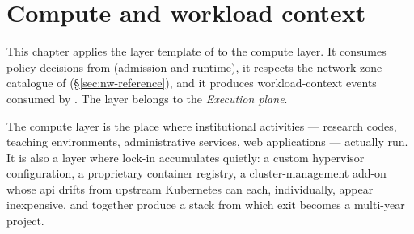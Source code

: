 
\chapter{Compute and workload context}
\label{ch:compute}

\begin{caveatbox}[Dependencies]
\noindent This chapter applies the layer template of
 to the compute layer. It consumes policy
decisions from  (admission and runtime), it
respects the network zone catalogue of 
(\S\ref{sec:nw-reference}), and it produces workload-context events
consumed by . The layer belongs to the
\emph{Execution plane}.
\end{caveatbox}

The compute layer is the place where institutional activities ---
research codes, teaching environments, administrative services, web
applications --- actually run. It is also a layer where lock-in
accumulates quietly: a custom hypervisor configuration, a
proprietary container registry, a cluster-management add-on whose
\gls{api} drifts from upstream Kubernetes can each, individually,
appear inexpensive, and together produce a stack from which exit
becomes a multi-year project.


